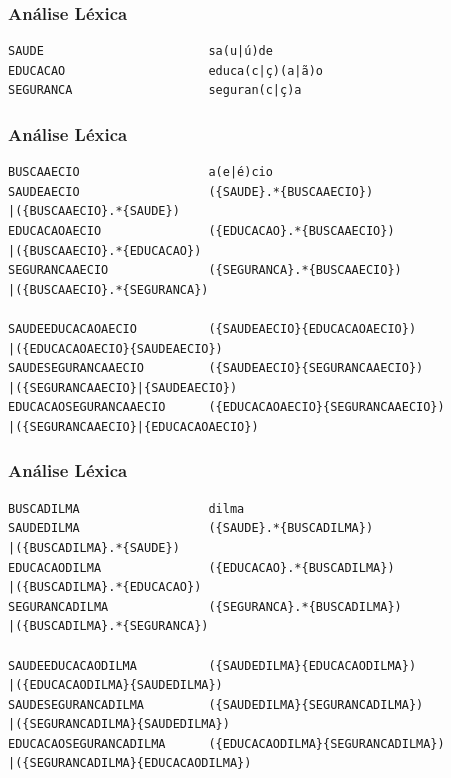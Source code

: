 
\begin{frame}[fragile]
\frametitle{Análise Léxica}
\begin{example}
\begin{verbatim}
SAUDE						sa(u|ú)de
EDUCACAO					educa(c|ç)(a|ã)o
SEGURANCA					seguran(c|ç)a\end{verbatim}
\end{example}
\end{frame}


\begin{frame}[fragile]
\frametitle{Análise Léxica}
\begin{example}
\begin{verbatim}
BUSCAAECIO 					a(e|é)cio
SAUDEAECIO 					({SAUDE}.*{BUSCAAECIO})
|({BUSCAAECIO}.*{SAUDE})
EDUCACAOAECIO				({EDUCACAO}.*{BUSCAAECIO})
|({BUSCAAECIO}.*{EDUCACAO})
SEGURANCAAECIO				({SEGURANCA}.*{BUSCAAECIO})
|({BUSCAAECIO}.*{SEGURANCA})

SAUDEEDUCACAOAECIO			({SAUDEAECIO}{EDUCACAOAECIO})
|({EDUCACAOAECIO}{SAUDEAECIO})
SAUDESEGURANCAAECIO			({SAUDEAECIO}{SEGURANCAAECIO})
|({SEGURANCAAECIO}|{SAUDEAECIO})
EDUCACAOSEGURANCAAECIO		({EDUCACAOAECIO}{SEGURANCAAECIO})
|({SEGURANCAAECIO}|{EDUCACAOAECIO})\end{verbatim}
\end{example}
\end{frame}


\begin{frame}[fragile]
\frametitle{Análise Léxica}
\begin{example}
\begin{verbatim}
BUSCADILMA 					dilma
SAUDEDILMA 					({SAUDE}.*{BUSCADILMA})
|({BUSCADILMA}.*{SAUDE})
EDUCACAODILMA				({EDUCACAO}.*{BUSCADILMA})
|({BUSCADILMA}.*{EDUCACAO})
SEGURANCADILMA				({SEGURANCA}.*{BUSCADILMA})
|({BUSCADILMA}.*{SEGURANCA})

SAUDEEDUCACAODILMA			({SAUDEDILMA}{EDUCACAODILMA})
|({EDUCACAODILMA}{SAUDEDILMA})
SAUDESEGURANCADILMA			({SAUDEDILMA}{SEGURANCADILMA})
|({SEGURANCADILMA}{SAUDEDILMA})
EDUCACAOSEGURANCADILMA		({EDUCACAODILMA}{SEGURANCADILMA})
|({SEGURANCADILMA}{EDUCACAODILMA})\end{verbatim}
\end{example}
\end{frame}

